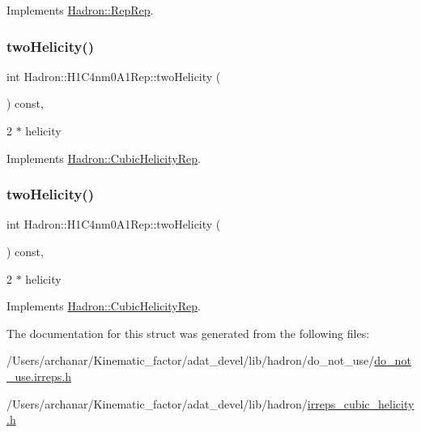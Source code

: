 Implements \mbox{\hyperlink{structHadron_1_1RepRep_ab3213025f6de249f7095892109575fde}{Hadron\+::\+Rep\+Rep}}.

\mbox{\label{structHadron_1_1H1C4nm0A1Rep_a878150ec7ce5bf97a9d20d5cf82a16a9}} 
\subsubsection{\texorpdfstring{twoHelicity()}{twoHelicity()}\hspace{0.1cm}{\footnotesize\ttfamily [1/2]}}
{\footnotesize\ttfamily int Hadron\+::\+H1\+C4nm0\+A1\+Rep\+::two\+Helicity (\begin{DoxyParamCaption}{ }\end{DoxyParamCaption}) const\hspace{0.3cm}{\ttfamily [inline]}, {\ttfamily [virtual]}}

2 $\ast$ helicity 

Implements \mbox{\hyperlink{structHadron_1_1CubicHelicityRep_af507aa56fc2747eacc8cb6c96db31ecc}{Hadron\+::\+Cubic\+Helicity\+Rep}}.

\mbox{\label{structHadron_1_1H1C4nm0A1Rep_a878150ec7ce5bf97a9d20d5cf82a16a9}} 
\subsubsection{\texorpdfstring{twoHelicity()}{twoHelicity()}\hspace{0.1cm}{\footnotesize\ttfamily [2/2]}}
{\footnotesize\ttfamily int Hadron\+::\+H1\+C4nm0\+A1\+Rep\+::two\+Helicity (\begin{DoxyParamCaption}{ }\end{DoxyParamCaption}) const\hspace{0.3cm}{\ttfamily [inline]}, {\ttfamily [virtual]}}

2 $\ast$ helicity 

Implements \mbox{\hyperlink{structHadron_1_1CubicHelicityRep_af507aa56fc2747eacc8cb6c96db31ecc}{Hadron\+::\+Cubic\+Helicity\+Rep}}.



The documentation for this struct was generated from the following files\+:\begin{DoxyCompactItemize}
\item 
/\+Users/archanar/\+Kinematic\+\_\+factor/adat\+\_\+devel/lib/hadron/do\+\_\+not\+\_\+use/\mbox{\hyperlink{do__not__use_8irreps_8h}{do\+\_\+not\+\_\+use.\+irreps.\+h}}\item 
/\+Users/archanar/\+Kinematic\+\_\+factor/adat\+\_\+devel/lib/hadron/\mbox{\hyperlink{lib_2hadron_2irreps__cubic__helicity_8h}{irreps\+\_\+cubic\+\_\+helicity.\+h}}\end{DoxyCompactItemize}
